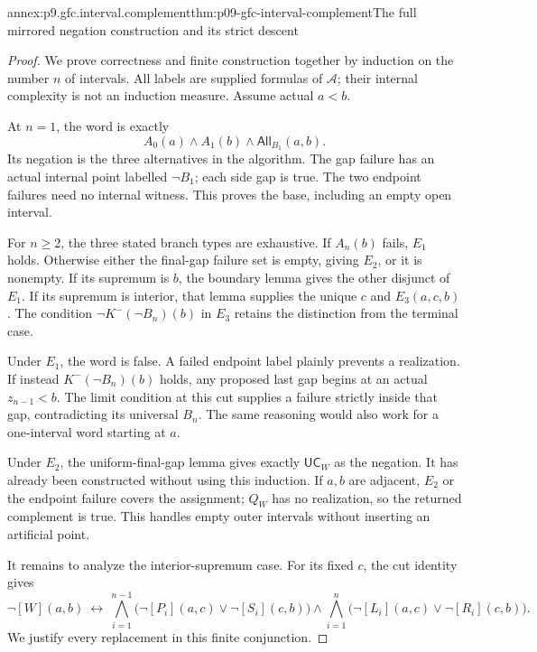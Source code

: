 \begin{annexitem}{annex:p9.gfc.interval.complement}{thm:p09-gfc-interval-complement}{The full mirrored negation construction and its strict descent}
\begin{proof}
We prove correctness and
finite construction together
by induction on the number
\(n\) of intervals. All
labels are supplied formulas
of \(\mathcal A\); their
internal complexity is
not an induction measure.
Assume actual \(a<b\).

At \(n=1\), the word
is exactly
\[
          A_0(a)\land A_1(b)\land
                         \mathsf{All}_{B_1}(a,b).
\]
Its negation is the
three alternatives in
the algorithm. The
gap failure has an
actual internal point
labelled \(\neg B_1\);
each side gap is true.
The two endpoint
failures need no
internal witness.
This proves the
base, including an
empty open interval.

For \(n\geq2\), the
three stated branch
types are exhaustive.
If \(A_n(b)\) fails,
\(E_1\) holds.
Otherwise either the
final-gap failure set
is empty, giving \(E_2\),
or it is nonempty.
If its supremum is
\(b\), the boundary
lemma gives the
other disjunct of
\(E_1\). If its
supremum is interior,
that lemma supplies
the unique \(c\)
and \(E_3(a,c,b)\).
The condition
\(\neg K^-(\neg B_n)(b)\)
in \(E_3\) retains
the distinction from
the terminal case.

Under \(E_1\), the word
is false. A failed
endpoint label plainly
prevents a realization.
If instead \(K^-(\neg B_n)(b)\)
holds, any proposed
last gap begins at
an actual \(z_{n-1}<b\).
The limit condition
at this cut supplies
a failure strictly
inside that gap,
contradicting its
universal \(B_n\).
The same reasoning
would also work
for a one-interval
word starting at \(a\).

Under \(E_2\), the
uniform-final-gap
lemma gives exactly
\(\mathsf{UC}_W\)
as the negation.
It has already been
constructed without
using this induction.
If \(a,b\) are
adjacent, \(E_2\)
or the endpoint
failure covers the
assignment; \(Q_W\)
has no realization,
so the returned
complement is true.
This handles empty
outer intervals
without inserting
an artificial point.

It remains to analyze
the interior-supremum
case. For its fixed
\(c\), the cut
identity gives
\[
 \neg[W](a,b)\ \longleftrightarrow\
 \bigwedge_{i=1}^{n-1}
       \bigl(\neg[P_i](a,c)\lor\neg[S_i](c,b)\bigr)
 \land
 \bigwedge_{i=1}^{n}
       \bigl(\neg[L_i](a,c)\lor\neg[R_i](c,b)\bigr).
 \tag{1}
\]
We justify every
replacement in this
finite conjunction.


\end{proof}
\end{annexitem}
